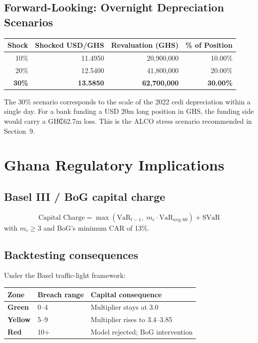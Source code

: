 \documentclass[11pt,a4paper]{article}
\begin{document}
\subsection{Forward-Looking: Overnight Depreciation Scenarios}

\begin{table}[h!]
\centering
\renewcommand{\arraystretch}{1.3}
\begin{tabular}{r r r r}
\toprule
\textbf{Shock} & \textbf{Shocked USD/GHS} & \textbf{Revaluation (GHS)} & \textbf{\% of Position} \\
\midrule
10\% & 11.4950 & 20{,}900{,}000 & 10.00\% \\
20\% & 12.5400 & 41{,}800{,}000 & 20.00\% \\
\textbf{30\%} & \textbf{13.5850} & \textbf{62{,}700{,}000} & \textbf{30.00\%} \\
\bottomrule
\end{tabular}
\end{table}

\noindent The 30\% scenario corresponds to the scale of the 2022 cedi
depreciation within a single day. For a bank funding a USD 20m long
position in GHS, the funding side would carry a GH₵62.7m loss. This is
the ALCO stress scenario recommended in Section~9.

\section{Ghana Regulatory Implications}

\subsection{Basel III / BoG capital charge}
\begin{equation}
\text{Capital Charge} = \max\!\left(\text{VaR}_{t-1},\;
m_c \cdot \text{VaR}_{avg,60}\right) + \text{SVaR}
\end{equation}
with \(m_c \geq 3\) and BoG's minimum CAR of 13\%.

\subsection{Backtesting consequences}

Under the Basel traffic-light framework:

\begin{table}[h!]
\centering
\renewcommand{\arraystretch}{1.3}
\begin{tabular}{L{3cm} L{5cm} L{5cm}}
\toprule
\textbf{Zone} & \textbf{Breach range} & \textbf{Capital consequence} \\
\midrule
\textcolor{ghgreen}{\textbf{Green}}  & 0--4   & Multiplier stays at 3.0 \\
\textcolor{ghgold}{\textbf{Yellow}}  & 5--9   & Multiplier rises to 3.4--3.85 \\
\textcolor{ghred}{\textbf{Red}}      & 10+    & Model rejected; BoG intervention \\
\bottomrule
\end{tabular}
\end{table}
\end{document}
